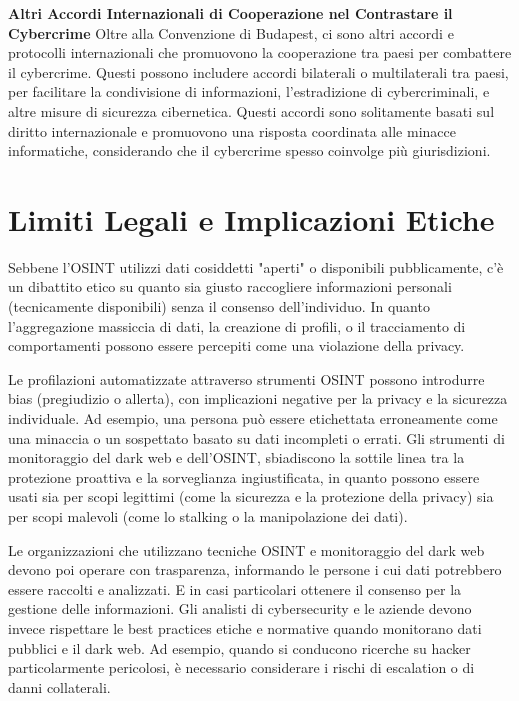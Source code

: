 \textbf{Altri Accordi Internazionali di Cooperazione nel Contrastare il Cybercrime}
Oltre alla Convenzione di Budapest, ci sono altri accordi e protocolli internazionali che promuovono la cooperazione tra paesi per combattere il cybercrime. Questi possono includere accordi bilaterali o multilaterali tra paesi, per facilitare la condivisione di informazioni, l'estradizione di cybercriminali, e altre misure di sicurezza cibernetica.
Questi accordi sono solitamente basati sul diritto internazionale e promuovono una risposta coordinata alle minacce informatiche, considerando che il cybercrime spesso coinvolge più giurisdizioni.


\section{Limiti Legali e Implicazioni Etiche}\label{sec:cap_sec_cons2}

Sebbene l'OSINT utilizzi dati cosiddetti "aperti" o disponibili pubblicamente, c'è un dibattito etico su quanto sia giusto raccogliere informazioni personali (tecnicamente disponibili) senza il consenso dell'individuo. 
In quanto l'aggregazione massiccia di dati, la creazione di profili, o il tracciamento di comportamenti possono essere percepiti come una violazione della privacy.

Le profilazioni automatizzate attraverso strumenti OSINT possono introdurre bias (pregiudizio o allerta), con implicazioni negative per la privacy e la sicurezza individuale. Ad esempio, una persona può essere etichettata erroneamente come una minaccia o un sospettato basato su dati incompleti o errati.
Gli strumenti di monitoraggio del dark web e dell'OSINT, sbiadiscono la sottile linea tra la protezione proattiva e la sorveglianza ingiustificata, in quanto possono essere usati sia per scopi legittimi (come la sicurezza e la protezione della privacy) sia per scopi malevoli (come lo stalking o la manipolazione dei dati). 

Le organizzazioni che utilizzano tecniche OSINT e monitoraggio del dark web devono poi operare con trasparenza, informando le persone i cui dati potrebbero essere raccolti e analizzati. E in casi particolari ottenere il consenso per la gestione delle informazioni.
Gli analisti di cybersecurity e le aziende devono invece rispettare le best practices etiche e normative quando monitorano dati pubblici e il dark web. Ad esempio, quando si conducono ricerche su hacker particolarmente pericolosi, è necessario considerare i rischi di escalation o di danni collaterali.
